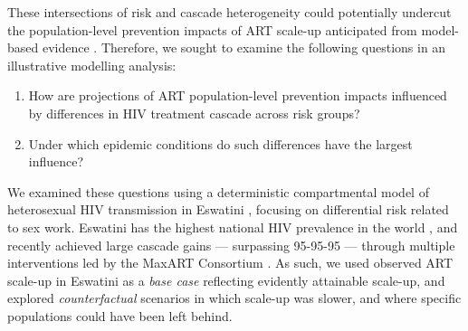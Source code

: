 These intersections of risk and cascade heterogeneity
could potentially undercut the population-level prevention impacts of ART scale-up
anticipated from model-based evidence \cite{Baral2019}.
Therefore, we sought to examine the following questions
in an illustrative modelling analysis:
\begin{enumerate}
  \item\label{obj:art.1} How are projections of ART population-level prevention impacts
    influenced by differences in HIV treatment cascade across risk groups?
  \item\label{obj:art.2} Under which epidemic conditions
    do such differences have the largest influence?
\end{enumerate}
We examined these questions using
a deterministic compartmental model of heterosexual HIV transmission in Eswatini \cite{Knight2019},
focusing on differential risk related to sex work.
Eswatini has the highest national HIV prevalence in the world \cite{UNAIDS2021},
and recently achieved large cascade gains --- surpassing 95-95-95 ---
through multiple interventions led by the MaxART Consortium \cite{Walsh2020,SHIMS3,AIDSinfo}.
As such, we used observed ART scale-up in Eswatini as a \emph{base case}
reflecting evidently attainable scale-up,
and explored \emph{counterfactual} scenarios in which scale-up was slower,
and where specific populations could have been left behind.
